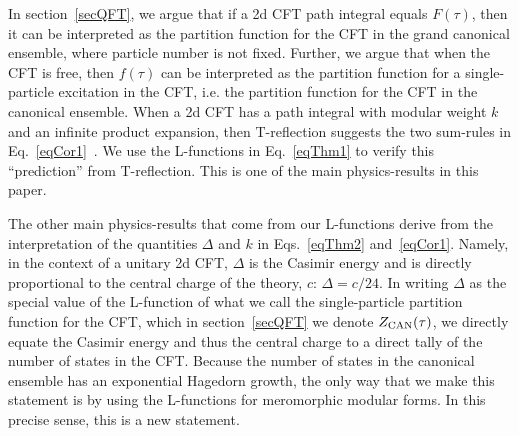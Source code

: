 \documentclass[11pt,a4paper]{article}
\begin{document}
In section~\ref{secQFT}, we argue that if a 2d CFT path integral equals $F(\tau)$, then it can be interpreted as the partition function for the CFT in the grand canonical ensemble, where particle number is not fixed. Further, we argue that when the CFT is free, then $f(\tau)$ can be interpreted as the partition function for a single-particle excitation in the CFT, i.e. the partition function for the CFT in the canonical ensemble. When a 2d CFT has a path integral with modular weight $k$ and an infinite product expansion, then T-reflection suggests the two sum-rules in Eq.~\eqref{eqCor1}~\cite{06T-rex1, 07T-rex2}. We use the L-functions in Eq.~\eqref{eqThm1} to verify this ``prediction'' from T-reflection. This is one of the main physics-results in this paper.

The other main physics-results that come from our L-functions derive from the interpretation of the quantities $\Delta$ and $k$ in Eqs.~\eqref{eqThm2} and~\eqref{eqCor1}. Namely, in the context of a unitary 2d CFT, $\Delta$ is the Casimir energy and is directly proportional to the central charge of the theory, $c$: $\Delta = c/24$. In writing $\Delta$ as the special value of the L-function of what we call the single-particle partition function for the CFT, which in section~\ref{secQFT} we denote $Z_{\rm CAN}(\tau)$, we directly equate the Casimir energy and thus the central charge to a direct tally of the number of states in the CFT. Because the number of states in the canonical ensemble has an exponential Hagedorn growth, the only way that we make this statement is by using the L-functions for meromorphic modular forms. In this precise sense, this is a new statement. 

\end{document}

